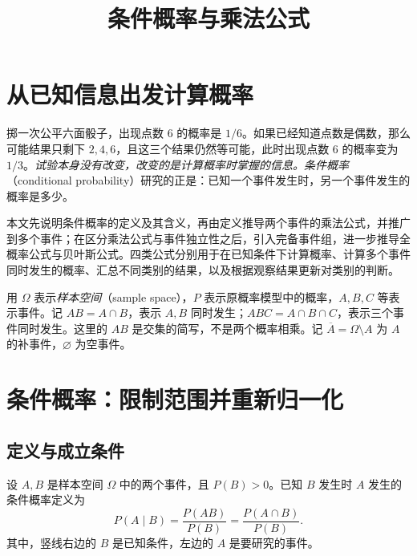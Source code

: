 \documentclass[UTF8,12pt,a4paper,fontset=fandol]{ctexart}
\title{条件概率与乘法公式}
\author{}
\date{}
\begin{document}
\maketitle

\section{从已知信息出发计算概率}
\label{sec:conditional-product-introduction}

掷一次公平六面骰子，出现点数 $6$ 的概率是 $1/6$。如果已经知道点数是偶数，那么可能结果只剩下 $2,4,6$，且这三个结果仍然等可能，此时出现点数 $6$ 的概率变为 $1/3$。\emph{试验本身没有改变，改变的是计算概率时掌握的信息。}\emph{条件概率}（conditional probability）研究的正是：已知一个事件发生时，另一个事件发生的概率是多少。

本文先说明条件概率的定义及其含义，再由定义推导两个事件的乘法公式，并推广到多个事件；在区分乘法公式与事件独立性之后，引入完备事件组，进一步推导全概率公式与贝叶斯公式。四类公式分别用于在已知条件下计算概率、计算多个事件同时发生的概率、汇总不同类别的结果，以及根据观察结果更新对类别的判断。

用 $\Omega$ 表示\emph{样本空间}（sample space），$P$ 表示原概率模型中的概率，$A,B,C$ 等表示事件。记 $AB=A\cap B$，表示 $A,B$ 同时发生；$ABC=A\cap B\cap C$，表示三个事件同时发生。这里的 $AB$ 是交集的简写，不是两个概率相乘。记 $\overline A=\Omega\setminus A$ 为 $A$ 的补事件，$\varnothing$ 为空事件。

\section{条件概率：限制范围并重新归一化}
\label{sec:conditional-product-definition}

\subsection{定义与成立条件}

\begin{definition}[条件概率]
\label{def:conditional-product-conditional}
设 $A,B$ 是样本空间 $\Omega$ 中的两个事件，且 $P(B)>0$。已知 $B$ 发生时 $A$ 发生的条件概率定义为
\begin{equation}
  P(A\mid B)=\frac{P(AB)}{P(B)}
            =\frac{P(A\cap B)}{P(B)}.
  \label{eq:conditional-product-definition}
\end{equation}
其中，竖线右边的 $B$ 是已知条件，左边的 $A$ 是要研究的事件。
\end{definition}
\end{document}
